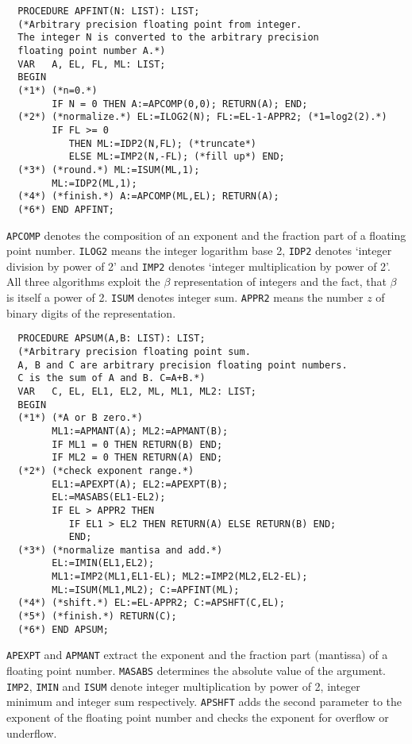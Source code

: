 {\footnotesize
\begin{verbatim}
  PROCEDURE APFINT(N: LIST): LIST;
  (*Arbitrary precision floating point from integer.
  The integer N is converted to the arbitrary precision
  floating point number A.*)
  VAR   A, EL, FL, ML: LIST;
  BEGIN
  (*1*) (*n=0.*)
        IF N = 0 THEN A:=APCOMP(0,0); RETURN(A); END;
  (*2*) (*normalize.*) EL:=ILOG2(N); FL:=EL-1-APPR2; (*1=log2(2).*)
        IF FL >= 0 
           THEN ML:=IDP2(N,FL); (*truncate*)   
           ELSE ML:=IMP2(N,-FL); (*fill up*) END; 
  (*3*) (*round.*) ML:=ISUM(ML,1); 
        ML:=IDP2(ML,1);
  (*4*) (*finish.*) A:=APCOMP(ML,EL); RETURN(A);
  (*6*) END APFINT;
\end{verbatim}
}
\verb/APCOMP/ denotes the composition of an 
exponent and the fraction part of a floating point number.
\verb/ILOG2/ means the integer logarithm base 2, 
\verb/IDP2/ denotes `integer division by power of 2' and
\verb/IMP2/ denotes `integer multiplication by power of 2'.
All three algorithms exploit the $\beta$ representation of
integers and the fact, that $\beta$ is itself a power of 2.
\verb/ISUM/ denotes integer sum.
\verb/APPR2/ means the number $z$ of
binary digits of the representation.

{\footnotesize
\begin{verbatim}
  PROCEDURE APSUM(A,B: LIST): LIST;
  (*Arbitrary precision floating point sum.
  A, B and C are arbitrary precision floating point numbers.
  C is the sum of A and B. C=A+B.*)
  VAR   C, EL, EL1, EL2, ML, ML1, ML2: LIST;
  BEGIN
  (*1*) (*A or B zero.*) 
        ML1:=APMANT(A); ML2:=APMANT(B); 
        IF ML1 = 0 THEN RETURN(B) END;
        IF ML2 = 0 THEN RETURN(A) END;
  (*2*) (*check exponent range.*) 
        EL1:=APEXPT(A); EL2:=APEXPT(B); 
        EL:=MASABS(EL1-EL2);
        IF EL > APPR2 THEN 
           IF EL1 > EL2 THEN RETURN(A) ELSE RETURN(B) END;
           END;
  (*3*) (*normalize mantisa and add.*) 
        EL:=IMIN(EL1,EL2); 
        ML1:=IMP2(ML1,EL1-EL); ML2:=IMP2(ML2,EL2-EL);
        ML:=ISUM(ML1,ML2); C:=APFINT(ML);
  (*4*) (*shift.*) EL:=EL-APPR2; C:=APSHFT(C,EL);
  (*5*) (*finish.*) RETURN(C);
  (*6*) END APSUM;
\end{verbatim}
}
\verb/APEXPT/ and \verb/APMANT/ extract the exponent 
and the fraction part (mantissa) of a floating point number.
\verb/MASABS/ determines the absolute value of the argument.
\verb/IMP2/, \verb/IMIN/ and \verb/ISUM/ denote 
integer multiplication by power of 2, integer minimum and integer sum 
respectively.
\verb/APSHFT/ adds the second parameter to the
exponent of the floating point number 
and checks the exponent for overflow or underflow.


